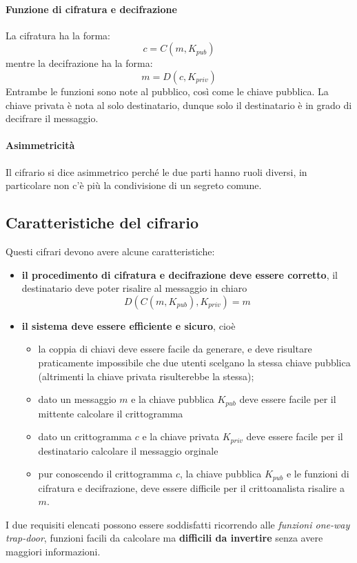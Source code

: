 \paragraph{Funzione di cifratura e decifrazione} La cifratura ha la forma:
$$ c = C(m, K_{pub}) $$
mentre la decifrazione ha la forma:
$$ m = D(c, K_{priv})$$
Entrambe le funzioni sono note al pubblico, così come le chiave pubblica. La chiave privata è nota al solo destinatario, dunque solo il destinatario è in grado di decifrare il messaggio.

\paragraph{Asimmetricità} Il cifrario si dice asimmetrico perché le due parti hanno ruoli diversi, in particolare non c'è più la condivisione di un segreto comune. 

\subsection{Caratteristiche del cifrario}
Questi cifrari devono avere alcune caratteristiche:
\begin{itemize}
    \item \textbf{il procedimento di cifratura e decifrazione deve essere corretto}, il destinatario deve poter risalire al messaggio in chiaro
    $$D(C(m, K_{pub}), K_{priv}) = m$$
    \item \textbf{il sistema deve essere efficiente e sicuro}, cioè 
    \begin{itemize}
    	\item la coppia di chiavi deve essere facile da generare, e deve risultare praticamente impossibile che due utenti scelgano la stessa chiave pubblica (altrimenti la chiave privata risulterebbe la stessa);
    	\item dato un messaggio $m$ e la chiave pubblica $K_{pub}$ deve essere facile per il mittente calcolare il crittogramma
    	\item dato un crittogramma $c$ e la chiave privata $K_{priv}$ deve essere facile per il destinatario calcolare il messaggio orginale
    	\item pur conoscendo il crittogramma $c$, la chiave pubblica $K_{pub}$ e le funzioni di cifratura e decifrazione, deve essere difficile per il crittoanalista risalire a $m$. 
    \end{itemize}
\end{itemize}
I due requisiti elencati possono essere soddisfatti ricorrendo alle \emph{funzioni one-way trap-door}, funzioni facili da calcolare ma \textbf{difficili da invertire} senza avere maggiori informazioni.
